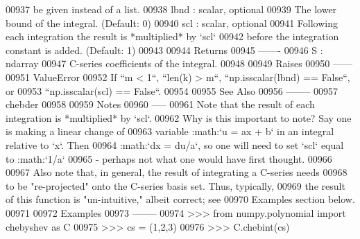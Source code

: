 \begin{DoxyCode}
00937 \textcolor{stringliteral}{        be given instead of a list.}
00938 \textcolor{stringliteral}{    lbnd : scalar, optional}
00939 \textcolor{stringliteral}{        The lower bound of the integral. (Default: 0)}
00940 \textcolor{stringliteral}{    scl : scalar, optional}
00941 \textcolor{stringliteral}{        Following each integration the result is *multiplied* by `scl`}
00942 \textcolor{stringliteral}{        before the integration constant is added. (Default: 1)}
00943 \textcolor{stringliteral}{}
00944 \textcolor{stringliteral}{    Returns}
00945 \textcolor{stringliteral}{    -------}
00946 \textcolor{stringliteral}{    S : ndarray}
00947 \textcolor{stringliteral}{        C-series coefficients of the integral.}
00948 \textcolor{stringliteral}{}
00949 \textcolor{stringliteral}{    Raises}
00950 \textcolor{stringliteral}{    ------}
00951 \textcolor{stringliteral}{    ValueError}
00952 \textcolor{stringliteral}{        If ``m < 1``, ``len(k) > m``, ``np.isscalar(lbnd) == False``, or}
00953 \textcolor{stringliteral}{        ``np.isscalar(scl) == False``.}
00954 \textcolor{stringliteral}{}
00955 \textcolor{stringliteral}{    See Also}
00956 \textcolor{stringliteral}{    --------}
00957 \textcolor{stringliteral}{    chebder}
00958 \textcolor{stringliteral}{}
00959 \textcolor{stringliteral}{    Notes}
00960 \textcolor{stringliteral}{    -----}
00961 \textcolor{stringliteral}{    Note that the result of each integration is *multiplied* by `scl`.}
00962 \textcolor{stringliteral}{    Why is this important to note?  Say one is making a linear change of}
00963 \textcolor{stringliteral}{    variable :math:`u = ax + b` in an integral relative to `x`.  Then}
00964 \textcolor{stringliteral}{    :math:`dx = du/a`, so one will need to set `scl` equal to :math:`1/a`}
00965 \textcolor{stringliteral}{    - perhaps not what one would have first thought.}
00966 \textcolor{stringliteral}{}
00967 \textcolor{stringliteral}{    Also note that, in general, the result of integrating a C-series needs}
00968 \textcolor{stringliteral}{    to be "re-projected" onto the C-series basis set.  Thus, typically,}
00969 \textcolor{stringliteral}{    the result of this function is "un-intuitive," albeit correct; see}
00970 \textcolor{stringliteral}{    Examples section below.}
00971 \textcolor{stringliteral}{}
00972 \textcolor{stringliteral}{    Examples}
00973 \textcolor{stringliteral}{    --------}
00974 \textcolor{stringliteral}{    >>> from numpy.polynomial import chebyshev as C}
00975 \textcolor{stringliteral}{    >>> cs = (1,2,3)}
00976 \textcolor{stringliteral}{    >>> C.chebint(cs)}

\end{DoxyCode}
